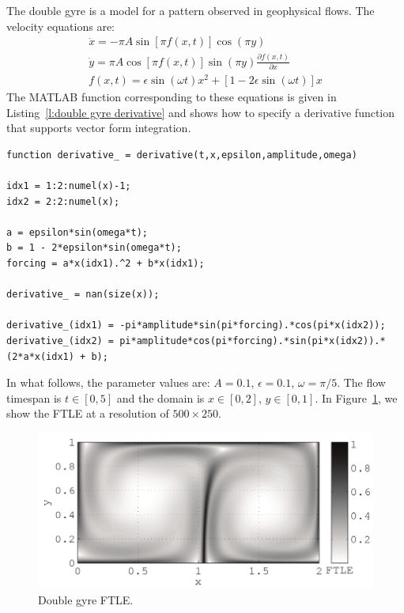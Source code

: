 \documentclass{article}
\begin{document}
The double gyre is a model for a pattern observed in geophysical flows\parencite{shadden05:_defin_lagran_lyapun}. The velocity equations are:
\begin{equation}
\begin{split}
\dot x = -\pi A \sin[\pi f(x,t)] \cos(\pi y)\\
\dot y = \pi A \cos[\pi f(x,t)] \sin(\pi y) \frac{\partial f(x,t)}{\partial x}\\
f(x,t) = \epsilon \sin(\omega t) x^2 + [1 - 2 \epsilon \sin(\omega t)] x
\end{split}
\label{eq:double gyre derivative equations}
\end{equation}
The MATLAB function corresponding to these equations is given in Listing~\ref{l:double gyre derivative} and shows how to specify a derivative function that supports vector form integration.

\begin{lstlisting}[caption={Double gyre derivative function corresponding to Equations~\ref{eq:double gyre derivative equations}.},label=l:double gyre derivative]
function derivative_ = derivative(t,x,epsilon,amplitude,omega)

idx1 = 1:2:numel(x)-1;
idx2 = 2:2:numel(x);

a = epsilon*sin(omega*t);
b = 1 - 2*epsilon*sin(omega*t);
forcing = a*x(idx1).^2 + b*x(idx1);

derivative_ = nan(size(x));

derivative_(idx1) = -pi*amplitude*sin(pi*forcing).*cos(pi*x(idx2));
derivative_(idx2) = pi*amplitude*cos(pi*forcing).*sin(pi*x(idx2)).*(2*a*x(idx1) + b);
\end{lstlisting}

In what follows, the parameter values are: $A = 0.1$, $\epsilon = 0.1$, $\omega = \pi/5$. The flow timespan is $t \in [0,5]$ and the domain is $x \in [0,2]$, $y \in [0,1]$. In Figure~\ref{f:double gyre FTLE}, we show the FTLE at a resolution of $500\times250$.

\begin{figure}
\begin{center}
\includegraphics[width=\textwidth]{graphics/double_gyre/ftle}
\end{center}
\caption{Double gyre FTLE.}
\label{f:double gyre FTLE}
\end{figure}
\end{document}
